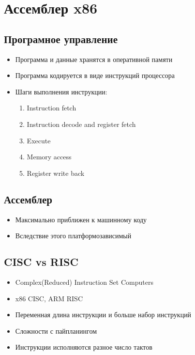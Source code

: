\newpage
\section{Ассемблер x86}
  \subsection{Програмное управление}
    \begin{itemize}
      \item Программа и данные хранятся в оперативной памяти
      \item Программа кодируется в виде инструкций процессора
      \item Шаги выполнения инструкции:
      \begin{enumerate}
        \item Instruction fetch
        \item Instruction decode and register fetch
        \item Execute
        \item Memory access
        \item Register write back
      \end{enumerate}
    \end{itemize}
  
  \subsection{Ассемблер}
    \begin{itemize}
      \item Максимально приближен к машинному коду
      \item Вследствие этого платформозависимый
    \end{itemize}
  
  \subsection{CISC vs RISC}
    \begin{itemize}
      \item Complex(Reduced) Instruction Set Computers
      \item x86 CISC, ARM RISC
      \item Переменная длина инструкции и больше набор инструкций
      \item Сложности с пайпланингом
      \item Инструкции исполняются разное число тактов
    \end{itemize}
  
